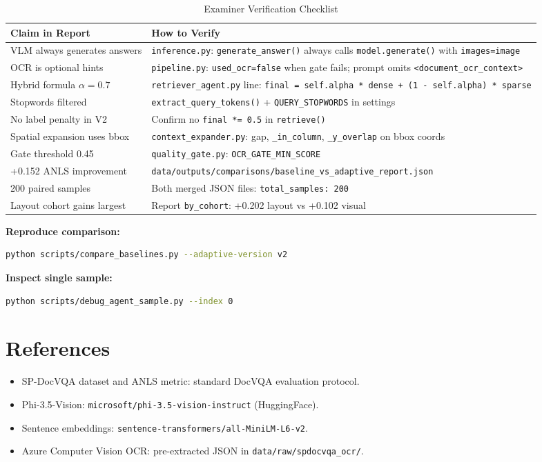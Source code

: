 \documentclass[11pt,a4paper]{article}
\begin{document}
\begin{table}[H]
\centering
\caption{Examiner Verification Checklist}
\label{tab:verification_checklist}
\begin{tabular}{|p{5.5cm}|p{9.5cm}|}
\hline
\textbf{Claim in Report} & \textbf{How to Verify} \\ \hline
VLM always generates answers & \texttt{inference.py}: \texttt{generate\_answer()} always calls \texttt{model.generate()} with \texttt{images=image} \\ \hline
OCR is optional hints & \texttt{pipeline.py}: \texttt{used\_ocr=false} when gate fails; prompt omits \texttt{<document\_ocr\_context>} \\ \hline
Hybrid formula $\alpha=0.7$ & \texttt{retriever\_agent.py} line: \texttt{final = self.alpha * dense + (1 - self.alpha) * sparse} \\ \hline
Stopwords filtered & \texttt{extract\_query\_tokens()} + \texttt{QUERY\_STOPWORDS} in settings \\ \hline
No label penalty in V2 & Confirm no \texttt{final *= 0.5} in \texttt{retrieve()} \\ \hline
Spatial expansion uses bbox & \texttt{context\_expander.py}: gap, \texttt{\_in\_column}, \texttt{\_y\_overlap} on bbox coords \\ \hline
Gate threshold 0.45 & \texttt{quality\_gate.py}: \texttt{OCR\_GATE\_MIN\_SCORE} \\ \hline
+0.152 ANLS improvement & \texttt{data/outputs/comparisons/baseline\_vs\_adaptive\_report.json} \\ \hline
200 paired samples & Both merged JSON files: \texttt{total\_samples: 200} \\ \hline
Layout cohort gains largest & Report \texttt{by\_cohort}: +0.202 layout vs +0.102 visual \\ \hline
\end{tabular}
\end{table}

\noindent\textbf{Reproduce comparison:}
\begin{lstlisting}[language=bash]
python scripts/compare_baselines.py --adaptive-version v2
\end{lstlisting}

\noindent\textbf{Inspect single sample:}
\begin{lstlisting}[language=bash]
python scripts/debug_agent_sample.py --index 0
\end{lstlisting}

\section*{References}
\begin{itemize}
    \item SP-DocVQA dataset and ANLS metric: standard DocVQA evaluation protocol.
    \item Phi-3.5-Vision: \texttt{microsoft/phi-3.5-vision-instruct} (HuggingFace).
    \item Sentence embeddings: \texttt{sentence-transformers/all-MiniLM-L6-v2}.
    \item Azure Computer Vision OCR: pre-extracted JSON in \texttt{data/raw/spdocvqa\_ocr/}.
\end{itemize}
\end{document}
